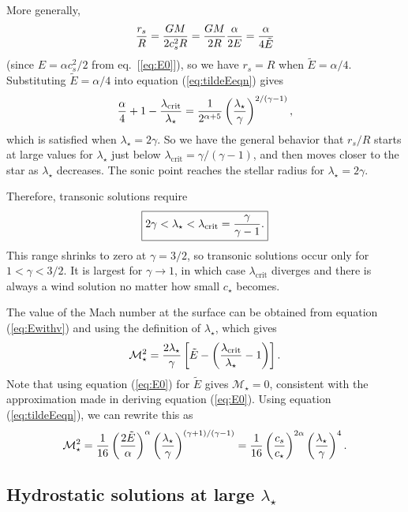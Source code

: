 \documentclass[preprint,12pt]{aastex}
\begin{document}
More generally, 
\begin{equation}
{r_s\over R} = {GM\over 2c_s^2R} = {GM\over 2R} {\alpha\over 2E} = {\alpha\over 4\tilde{E}}
\end{equation}
(since $E = \alpha c_s^2/2$ from eq.~[\ref{eq:E0}]), so we have $r_s=R$ when $\tilde{E} = \alpha/4$. Substituting $\tilde{E}=\alpha/4$ into equation (\ref{eq:tildeEeqn}) gives
\begin{equation}
{\alpha\over 4} + 1 - {\lambda_\mathrm{crit}\over \lambda_\star} = {1\over 2^{\alpha+5}} \left({\lambda_\star\over \gamma}\right)^{2/(\gamma-1)},
\end{equation}
which is satisfied when $\lambda_\star = 2\gamma$. So we have the general behavior that $r_s/R$ starts at large values for $\lambda_\star$ just below $\lambda_\mathrm{crit}=\gamma/(\gamma-1)$, and then moves closer to the star as $\lambda_\star$ decreases. The sonic point reaches the stellar radius for $\lambda_\star=2\gamma$. 

Therefore, transonic solutions require
\begin{equation}
\boxed{
2\gamma < \lambda_\star < \lambda_\mathrm{crit} ={\gamma\over \gamma-1}.
}
\end{equation}
This range shrinks to zero at $\gamma=3/2$, so transonic solutions occur only for $1<\gamma<3/2$. It is largest for $\gamma\rightarrow 1$, in which case $\lambda_\mathrm{crit}$ diverges and there is always a wind solution no matter how small $c_\star$ becomes.

The value of the Mach number at the surface can be obtained from equation (\ref{eq:Ewithv}) and using the definition of $\lambda_\star$, which gives
\begin{equation}
\mathcal{M}_\star^2 = {2\lambda_\star\over \gamma}\left[\tilde{E} - \left(  {\lambda_\mathrm{crit}\over \lambda_\star}-1\right)\right].
\end{equation}
Note that using equation (\ref{eq:E0}) for $\tilde{E}$ gives $\mathcal{M}_\star=0$, consistent with the approximation made in deriving equation (\ref{eq:E0}). Using equation (\ref{eq:tildeEeqn}), we can rewrite this as
\begin{equation}
\mathcal{M}_\star^2 = {1\over 16}\left({2\tilde{E}\over\alpha}\right)^\alpha \left({\lambda_\star\over \gamma}\right)^{(\gamma+1)/(\gamma-1)} = {1\over 16}\left({c_s\over c_\star}\right)^{2\alpha} \left({\lambda_\star\over \gamma}\right)^4.
\end{equation}

\subsection{Hydrostatic solutions at large $\lambda_\star$}
\end{document}
